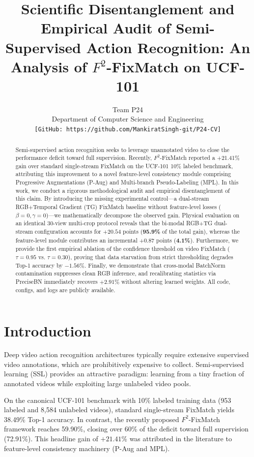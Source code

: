 \documentclass[10pt,twocolumn,letterpaper]{article}
\title{Scientific Disentanglement and Empirical Audit of Semi-Supervised Action Recognition: An Analysis of $F^2$-FixMatch on UCF-101}
\author{
Team P24\\
Department of Computer Science and Engineering\\
{\tt\small [GitHub: https://github.com/MankiratSingh-git/P24-CV]}
}
\begin{document}
\maketitle

\begin{abstract}
Semi-supervised action recognition seeks to leverage unannotated video to close the performance deficit toward full supervision. Recently, $F^2$-FixMatch reported a +21.41\% gain over standard single-stream FixMatch on the UCF-101 10\% labeled benchmark, attributing this improvement to a novel feature-level consistency module comprising Progressive Augmentations (P-Aug) and Multi-branch Pseudo-Labeling (MPL). In this work, we conduct a rigorous methodological audit and empirical disentanglement of this claim. By introducing the missing experimental control—a dual-stream RGB+Temporal Gradient (TG) FixMatch baseline without feature-level losses ($\beta=0, \gamma=0$)—we mathematically decompose the observed gain. Physical evaluation on an identical 30-view multi-crop protocol reveals that the bi-modal RGB+TG dual-stream configuration accounts for $\mathbf{+20.54}$ points (\textbf{95.9\%} of the total gain), whereas the feature-level module contributes an incremental $\mathbf{+0.87}$ points (\textbf{4.1\%}). Furthermore, we provide the first empirical ablation of the confidence threshold on video FixMatch ($\tau = 0.95$ vs. $\tau = 0.30$), proving that data starvation from strict thresholding degrades Top-1 accuracy by $-1.56\%$. Finally, we demonstrate that cross-modal BatchNorm contamination suppresses clean RGB inference, and recalibrating statistics via PreciseBN immediately recovers $+2.91\%$ without altering learned weights. All code, configs, and logs are publicly available.
\end{abstract}

\section{Introduction}
\label{sec:intro}
Deep video action recognition architectures typically require extensive supervised video annotations, which are prohibitively expensive to collect. Semi-supervised learning (SSL) provides an attractive paradigm: learning from a tiny fraction of annotated videos while exploiting large unlabeled video pools.

On the canonical UCF-101 benchmark with 10\% labeled training data (953 labeled and 8,584 unlabeled videos), standard single-stream FixMatch yields 38.49\% Top-1 accuracy. In contrast, the recently proposed $F^2$-FixMatch framework reaches 59.90\%, closing over 60\% of the deficit toward full supervision (72.91\%). This headline gain of $+21.41\%$ was attributed in the literature to feature-level consistency machinery (P-Aug and MPL). 
\end{document}
